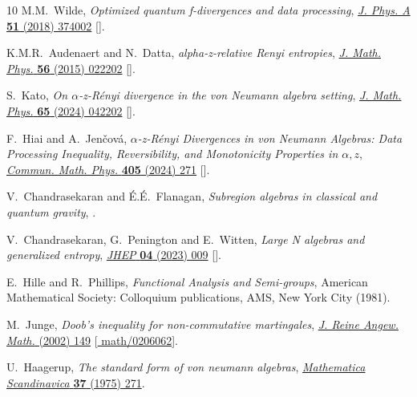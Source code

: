\documentclass[11pt,a4paper]{article}
\theoremstyle{plain}
\numberwithin{theorem}{section}
\theoremstyle{definition}
\newcommand{\?}{\overset{?}{=}}
\begin{document}
\begin{thebibliography}{10}
M.M.~Wilde, \emph{{Optimized quantum f-divergences and data processing}},
  \href{https://doi.org/10.1088/1751-8121/aad5a1}{\emph{J. Phys. A} {\bfseries
  51} (2018) 374002} [\href{https://arxiv.org/abs/1710.10252}{{}}].

K.M.R.~Audenaert and N.~Datta, \emph{{alpha-z-relative Renyi entropies}},
  \href{https://doi.org/10.1063/1.4906367}{\emph{J. Math. Phys.} {\bfseries 56}
  (2015) 022202} [\href{https://arxiv.org/abs/1310.7178}{{}}].

S.~Kato, \emph{{On {\ensuremath{\alpha}}-z-R{\'e}nyi divergence in the von
  Neumann algebra setting}}, \href{https://doi.org/10.1063/5.0186552}{\emph{J.
  Math. Phys.} {\bfseries 65} (2024) 042202}
  [\href{https://arxiv.org/abs/2311.01748}{{}}].

F.~Hiai and A.~Jen{\v{c}}ov{\'a}, \emph{{$\alpha $-z-R{\'e}nyi Divergences in
  von Neumann Algebras: Data Processing Inequality, Reversibility, and
  Monotonicity Properties in $\alpha ,z$}},
  \href{https://doi.org/10.1007/s00220-024-05124-1}{\emph{Commun. Math. Phys.}
  {\bfseries 405} (2024) 271}
  [\href{https://arxiv.org/abs/2404.07617}{{}}].

V.~Chandrasekaran and {\'E}.{\'E}.~Flanagan, \emph{{Subregion algebras in
  classical and quantum gravity}},
  \href{https://arxiv.org/abs/2601.07915}{{}}.

V.~Chandrasekaran, G.~Penington and E.~Witten, \emph{{Large N algebras and
  generalized entropy}},
  \href{https://doi.org/10.1007/JHEP04(2023)009}{\emph{JHEP} {\bfseries 04}
  (2023) 009} [\href{https://arxiv.org/abs/2209.10454}{{}}].

E.~Hille and R.~Phillips, \emph{Functional Analysis and Semi-groups}, American
  Mathematical Society: Colloquium publications, AMS, New York City (1981).

M.~Junge, \emph{Doob's inequality for non-commutative martingales},
  \href{https://doi.org/10.1515/crll.2002.061}{\emph{J. Reine Angew. Math.}
  (2002) 149} [\href{https://arxiv.org/abs/math/0206062}{{\ttfamily
  math/0206062}}].

U.~Haagerup, \emph{The standard form of von neumann algebras},
  \href{https://doi.org/10.7146/math.scand.a-11606}{\emph{Mathematica
  Scandinavica} {\bfseries 37} (1975) 271}.

\end{thebibliography}\endgroup
\end{document}
